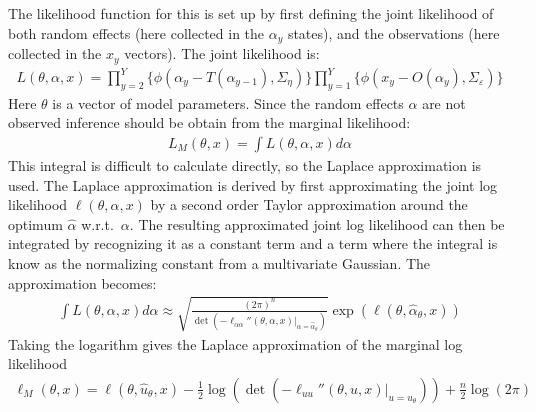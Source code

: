 \documentclass[12pt,letterpaper, leqno]{article}
\begin{document}
The likelihood function for this is set up by first defining the joint likelihood of both random effects (here collected in the $\alpha_y$ states), and the observations (here collected in the $x_y$ vectors). The joint likelihood is:
 \begin{align*}
 L(\theta,\alpha,x)=\prod_{y=2}^Y\{ \phi(\alpha_y-T(\alpha_{y-1}),\Sigma_\eta)\}
                    \prod_{y=1}^Y\{ \phi(x_y-O(\alpha_{y}),\Sigma_\varepsilon)\}
 \end{align*}
 Here $\theta$ is a vector of model parameters. Since the random effects $\alpha$ are not observed inference should be obtain from the marginal likelihood:
 \begin{align*}
 L_M(\theta,x)=\int L(\theta,\alpha,x) d\alpha
 \end{align*}
 This integral is difficult to calculate directly, so the Laplace  approximation is used. The Laplace approximation is derived by first  approximating the joint log likelihood $\ell(\theta,\alpha,x)$ by a  second order Taylor approximation around the optimum $\hat{\alpha}$  w.r.t.~$\alpha$. The resulting approximated joint log likelihood can  then be integrated by recognizing it as a constant term and a term  where the integral is know as the normalizing constant from a  multivariate Gaussian. The approximation becomes:
 \begin{align*}
 \int L(\theta,\alpha,x)d\alpha \approx  \sqrt{\frac{(2\pi)^{n}}{\det(-\ell_{\alpha\alpha}''(\theta,\alpha,x)|_{\alpha=\hat{\alpha}_\theta})}}\exp(\ell(\theta,\hat{\alpha}_\theta,x))
 \end{align*}
 Taking the logarithm gives the Laplace approximation of the marginal log likelihood  
 \begin{align*}
 \ell_M(\theta,x) = \ell(\theta,\hat{u}_\theta,x)-\frac{1}{2}\log(\det(-\ell_{uu}
 ''(\theta,u,x)|_{u=\hat{u}_\theta}))+\frac{n}{2}\log(2\pi)
 \end{align*}

\end{document}
